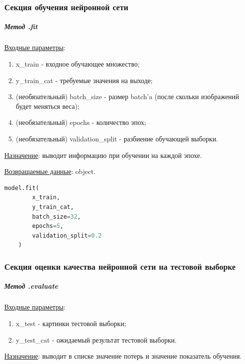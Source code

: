 \subsubsection{Секция обучения нейронной сети}


\subparagraph{Метод .fit} \hspace{0pt}

\underline{Входные параметры}:
\begin{enumerate}
    \item x\_train - входное обучающее множество;
    \item y\_train\_cat - требуемые значения на выходе;
    \item (необязательный) batch\_size - размер batch'a (после скольки изображений будет меняться веса);
    \item (необязательный) epochs - количество эпох;
    \item (необязательный) validation\_split - разбиение обучающей выборки.
\end{enumerate}

\underline{Назначение}: выводит информацию при обучении на каждой эпохе.

\underline{Возвращаемые данные}: object.

\begin{lstlisting}[language=Python,]
    model.fit(
        x_train,
        y_train_cat,
        batch_size=32,
        epochs=5,
        validation_split=0.2
    )
\end{lstlisting}



\newpage



\subsubsection{Секция оценки качества нейронной сети на тестовой выборке}

\subparagraph{Метод .evaluate} \hspace{0pt}

\underline{Входные параметры}:
\begin{enumerate}
    \item x\_test - картинки тестовой выборки;
    \item y\_test\_cat - ожидаемый результат тестовой выборки.
\end{enumerate}

\underline{Назначение}: выводит в списке значение потерь и значение показатель обучения.

